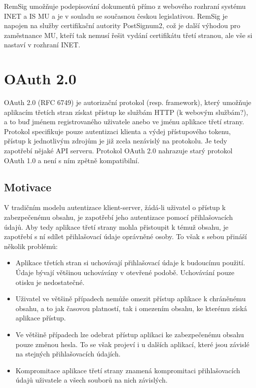 \documentclass[]{fithesis3}
\begin{document}
RemSig umožňuje podepisování dokumentů přímo z webového rozhraní systému INET a IS MU a je v souladu se současnou českou legislativou. RemSig je napojen na služby certifikační autority PostSignum2, což je další výhodou pro zaměstnance MU, kteří tak nemusí řešit vydání certifikátu třetí stranou, ale vše si nastaví v rozhraní INET.

\chapter{OAuth 2.0}

OAuth 2.0 (RFC 6749) je autorizační protokol (resp. framework), který umožňuje aplikacím třetích stran získat přístup ke službám HTTP (k webovým službám?), a to buď jménem registrovaného uživatele anebo ve jménu aplikace třetí strany. Protokol specifikuje pouze autentizaci klienta a výdej přístupového tokenu, přístup k jednotlivým zdrojům je již zcela nezávislý na protokolu. Je tedy zapotřebí nějaké API serveru. Protokol OAuth 2.0 nahrazuje starý protokol OAuth 1.0 a není s ním zpětně kompatibilní.

	\section{Motivace}

	V tradičním modelu autentizace klient-server, žádá-li uživatel o přístup k zabezpečenému 			obsahu, je zapotřebí jeho autentizace pomocí přihlašovacích údajů. Aby tedy aplikace třetí 			strany mohla přistoupit k témuž obsahu, je zapotřebí s ní sdílet přihlašovací údaje oprávněné 		osoby. To však s sebou přináší několik problémů:

		\begin{itemize}
  		\item 
		Aplikace třetích stran si uchovávají přihlašovací údaje k budoucímu použití. Údaje bývají 			většinou uchovávány v otevřené podobě. Uchovávání pouze otisku je nedostatečné.

 		 \item 
		Uživatel ve většině případech nemůže omezit přístup aplikace k chráněnému obsahu, a to 			jak časovou platností, tak i omezením obsahu, ke kterému získá aplikace přístup.

 		 \item 
		Ve většině případech lze odebrat přístup aplikaci ke zabezpečenému obsahu pouze 				změnou hesla. To se však projeví i u dalších aplikací, které jsou závislé na stejných 				přihlašovacích údajích.

  		\item 
		Kompromitace aplikace třetí strany znamená kompromitaci přihlašovacích údajů 					uživatele a všech souborů na nich závislých.
		\end{itemize}
\end{document}
